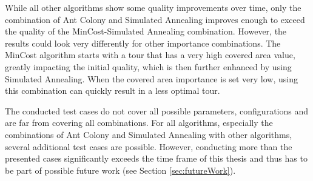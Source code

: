  
While all other algorithms show some quality improvements over time, only the combination of Ant Colony and Simulated Annealing improves enough to exceed the quality of the MinCost-Simulated Annealing combination.
However, the results could look very differently for other importance combinations.
The MinCost algorithm starts with a tour that has a very high covered area value, greatly impacting the initial quality, which is then further enhanced by using Simulated Annealing.
When the covered area importance is set very low, using this combination can quickly result in a less optimal tour.


The conducted test cases do not cover all possible parameters, configurations and are far from covering all combinations.
For all algorithms, especially the combinations of Ant Colony and Simulated Annealing with other algorithms, several additional test cases are possible.
However, conducting more than the presented cases significantly exceeds the time frame of this thesis and thus has to be part of possible future work (see Section \ref{sec:futureWork}).














